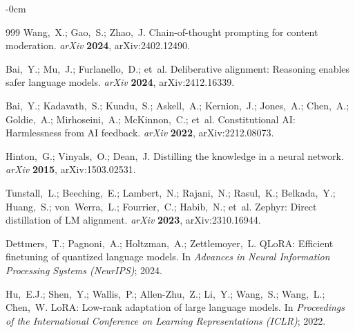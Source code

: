 \documentclass[Superintelligence,article,submit,pdftex,moreauthors]{Definitions/mdpi}
\begin{document}
\begin{adjustwidth}{-\extralength}{0cm}
{\begin{thebibliography}{999}
Wang,~X.; Gao,~S.; Zhao,~J.
Chain-of-thought prompting for content moderation.
{\em arXiv} {\bf 2024}, arXiv:2402.12490.

Bai,~Y.; Mu,~J.; Furlanello,~D.; et~al.
Deliberative alignment: Reasoning enables safer language models.
{\em arXiv} {\bf 2024}, arXiv:2412.16339.

Bai,~Y.; Kadavath,~S.; Kundu,~S.; Askell,~A.; Kernion,~J.; Jones,~A.; Chen,~A.; Goldie,~A.; Mirhoseini,~A.; McKinnon,~C.; et~al.
Constitutional {AI}: Harmlessness from {AI} feedback.
{\em arXiv} {\bf 2022}, arXiv:2212.08073.

Hinton,~G.; Vinyals,~O.; Dean,~J.
Distilling the knowledge in a neural network.
{\em arXiv} {\bf 2015}, arXiv:1503.02531.

Tunstall,~L.; Beeching,~E.; Lambert,~N.; Rajani,~N.; Rasul,~K.; Belkada,~Y.; Huang,~S.; von~Werra,~L.; Fourrier,~C.; Habib,~N.; et~al.
Zephyr: Direct distillation of {LM} alignment.
{\em arXiv} {\bf 2023}, arXiv:2310.16944.

Dettmers,~T.; Pagnoni,~A.; Holtzman,~A.; Zettlemoyer,~L.
{QLoRA}: Efficient finetuning of quantized language models.
In {\em Advances in Neural Information Processing Systems (NeurIPS)}; 2024.

Hu,~E.J.; Shen,~Y.; Wallis,~P.; Allen-Zhu,~Z.; Li,~Y.; Wang,~S.; Wang,~L.; Chen,~W.
{LoRA}: Low-rank adaptation of large language models.
In {\em Proceedings of the International Conference on Learning Representations (ICLR)}; 2022.

\end{thebibliography}
}

\PublishersNote{}
\end{adjustwidth}
\end{document}
